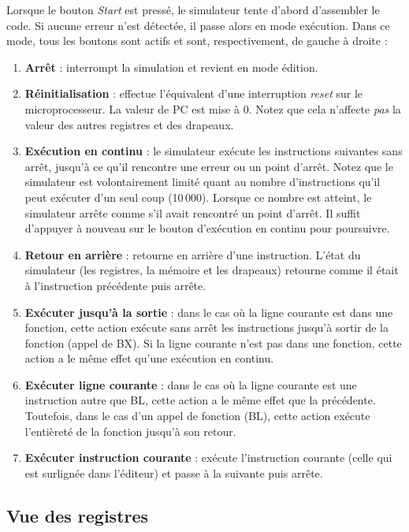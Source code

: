 \documentclass{tufte-handout}
\begin{document}
Lorsque le bouton \textit{Start} est pressé, le simulateur tente d'abord d'assembler le code. Si aucune erreur n'est détectée, il passe alors en mode exécution. Dans ce mode, tous les boutons sont actifs et sont, respectivement, de gauche à droite :
\begin{enumerate}
	\item \textbf{Arrêt} : interrompt la simulation et revient en mode édition.
	\item \textbf{Réinitialisation} : effectue l'équivalent d'une interruption \emph{reset} sur le microprocesseur. La valeur de PC est mise à $0$. Notez que cela n'affecte \emph{pas} la valeur des autres registres et des drapeaux.
	\item \textbf{Exécution en continu} : le simulateur exécute les instructions suivantes sans arrêt, jusqu'à ce qu'il rencontre une erreur ou un point d'arrêt. Notez que le simulateur est volontairement limité quant au nombre d'instructions qu'il peut exécuter d'un seul coup (10\,000). Lorsque ce nombre est atteint, le simulateur arrête comme s'il avait rencontré un point d'arrêt. Il suffit d'appuyer à nouveau sur le bouton d'exécution en continu pour poursuivre.
    \item \textbf{Retour en arrière} : retourne en arrière d'une instruction. L'état du simulateur (les registres, la mémoire et les drapeaux) retourne comme il était à l'instruction précédente puis arrête.
	\item \textbf{Exécuter jusqu'à la sortie} : dans le cas où la ligne courante est dans une fonction, cette action exécute sans arrêt les instructions jusqu'à sortir de la fonction (appel de BX). Si la ligne courante n'est pas dans une fonction, cette action a le même effet qu'une exécution en continu.
	\item \textbf{Exécuter ligne courante} : dans le cas où la ligne courante est une instruction autre que BL, cette action a le même effet que la précédente. Toutefois, dans le cas d'un appel de fonction (BL), cette action exécute l'entièreté de la fonction jusqu'à son retour.
	\item \textbf{Exécuter instruction courante} : exécute l'instruction courante (celle qui est surlignée dans l'éditeur) et passe à la suivante puis arrête.
\end{enumerate}

\clearpage

\subsection{Vue des registres}
\end{document}
